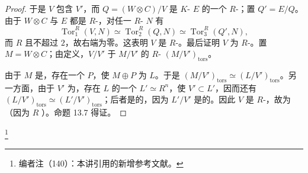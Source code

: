 \begin{proof}
于是 $V$ 包含 $V'$，而 $Q=(W\otimes C)/V$ 是 $K$- $E$ 的一个 $R$-；置 $Q'=E/Q$。由于 $W\otimes C$ 与 $E$ 都是 $R$-，对任一 $R$- $N$ 有
\[
\operatorname{Tor}_1^R(V,N)\simeq\operatorname{Tor}_2^R(Q,N)\simeq\operatorname{Tor}_3^R(Q',N),
\]
而 $R$ 且不超过 $2$，故右端为零。这表明 $V$ 是 $R$-。最后证明 $V$ 为 $R$-。置 $M=W\otimes C$；由定义，$V/V'$ 于 $M/V'$ 的 $R$- $(M/V')_{\mathrm{tors}}$。

由于 $M$ 是，存在一个 $P$，使 $M\oplus P$ 为 $L$。于是 $(M/V')_{\mathrm{tors}}\simeq(L/V')_{\mathrm{tors}}$。另一方面，由于 $V'$ 为，存在 $L$ 的一个 $L'\simeq R^n$，使 $V'\subset L'$，因而还有 $(L/V')_{\mathrm{tors}}\simeq(L'/V')_{\mathrm{tors}}$；后者是的，因为 $L'/V'$ 是的。因此 $V$ 是 $R$-，故为（因为 $R$ ）。命题 13.7 得证。
\end{proof}

\footnote{编者注（140）：本讲引用的新增参考文献。}

